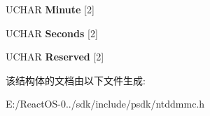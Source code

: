 \begin{DoxyCompactItemize}
U\+C\+H\+AR {\bfseries Minute} \mbox{[}2\mbox{]}
\item 
\mbox{\label{struct___f_e_a_t_u_r_e___d_a_t_a___f_i_r_m_w_a_r_e___d_a_t_e_a6d1488db41d101eb4a44ef709af9fa2b}} 
U\+C\+H\+AR {\bfseries Seconds} \mbox{[}2\mbox{]}
\item 
\mbox{\label{struct___f_e_a_t_u_r_e___d_a_t_a___f_i_r_m_w_a_r_e___d_a_t_e_a27a6a1d20b5d44f24e289f51138721b8}} 
U\+C\+H\+AR {\bfseries Reserved} \mbox{[}2\mbox{]}
\end{DoxyCompactItemize}


该结构体的文档由以下文件生成\+:\begin{DoxyCompactItemize}
\item 
E\+:/\+React\+O\+S-\/0../sdk/include/psdk/ntddmmc.\+h\end{DoxyCompactItemize}
